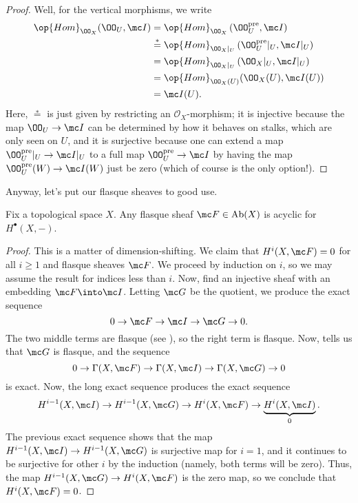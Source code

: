 \documentclass[../notes.tex]{subfiles}
\begin{document}
\begin{proof}
	Well, for the vertical morphisms, we write
	\begin{align*}
		\op{Hom}_{\OO_X}(\OO_U,\mc I) &= \op{Hom}_{\OO_X}\left(\OO_U^{\mathrm{pre}},\mc I\right) \\
		&\stackrel*= \op{Hom}_{\OO_X|_U}\left(\OO_U^{\mathrm{pre}}|_U,\mc I|_U\right) \\
		&= \op{Hom}_{\OO_X|_U}\left(\OO_X|_U,\mc I|_U\right) \\
		&= \op{Hom}_{\OO_X(U)}(\OO_X(U),\mc I(U)) \\
		&= \mc I(U).
	\end{align*}
	Here, $\stackrel*=$ is just given by restricting an $\mathcal O_X$-morphism; it is injective because the map $\OO_U\to\mc I$ can be determined by how it behaves on stalks, which are only seen on $U$, and it is surjective because one can extend a map $\OO_U^{\mathrm{pre}}|_U\to\mc I|_U$ to a full map $\OO_U^{\mathrm{pre}}\to\mc I$ by having the map $\OO_U^{\mathrm{pre}}(W)\to\mc I(W)$ just be zero (which of course is the only option!).
\end{proof}
Anyway, let's put our flasque sheaves to good use.
\begin{lemma} \label{lem:flasque-is-acyclic}
	Fix a topological space $X$. Any flasque sheaf $\mc F\in\mathrm{Ab}(X)$ is acyclic for $H^\bullet(X,-)$.
\end{lemma}
\begin{proof}
	This is a matter of dimension-shifting. We claim that $H^i(X,\mc F)=0$ for all $i\ge1$ and flasque sheaves $\mc F$. We proceed by induction on $i$, so we may assume the result for indices less than $i$. Now, find an injective sheaf with an embedding $\mc F\into\mc I$. Letting $\mc G$ be the quotient, we produce the exact sequence
	\[0\to\mc F\to\mc I\to\mc G\to0.\]
	The two middle terms are flasque (see ), so the right term is flasque. Now, \cite[Exercise~1.16]{hartshorne} tells us that $\mc G$ is flasque, and the sequence
	\[0\to\Gamma(X,\mc F)\to\Gamma(X,\mc I)\to\Gamma(X,\mc G)\to0\]
	is exact. Now, the long exact sequence produces the exact sequence
	\[H^{i-1}(X,\mc I)\to H^{i-1}(X,\mc G)\to H^i(X,\mc F)\to \underbrace{H^i(X,\mc I)}_0.\]
	The previous exact sequence shows that the map $H^{i-1}(X,\mc I)\to H^{i-1}(X,\mc G)$ is surjective map for $i=1$, and it continues to be surjective for other $i$ by the induction (namely, both terms will be zero). Thus, the map $H^{i-1}(X,\mc G)\to H^i(X,\mc F)$ is the zero map, so we conclude that $H^i(X,\mc F)=0$.
\end{proof}
\end{document}
